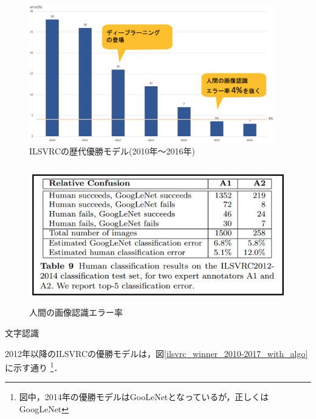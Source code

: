 \begin{figure} [H]
	\begin{center}
		\includegraphics[clip, height=6cm, bb=0 0 1976 1112]{data/figure/ilsvrc_winner_2010-2016.png}
		\caption{ILSVRCの歴代優勝モデル(2010年～2016年)}
		\label{ilsvrc_winner_2010-2016}
	\end{center}
\end{figure}

\begin{figure} [H]
	\begin{center}
		\includegraphics[clip, height=6cm, bb=-120 0 568 278]{data/figure/ilsvrc_human_classification_results.png}
		\caption{人間の画像認識エラー率}
		\label{ilsvrc_human_classification_results}
	\end{center}
\end{figure}文字認識

2012年以降のILSVRCの優勝モデルは，図\ref{ilsvrc_winner_2010-2017_with_algo}に示す通り \cite{dl_hist6} \footnote{図中，2014年の優勝モデルはGooLeNetとなっているが，正しくはGoogLeNet}．

